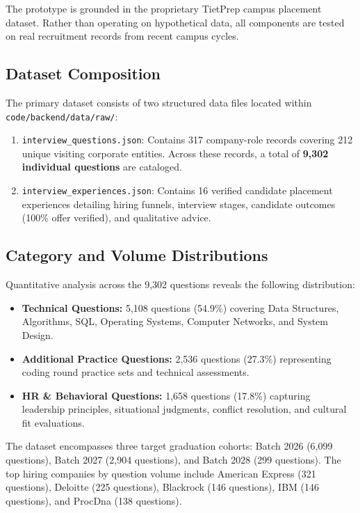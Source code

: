 \documentclass[11pt]{article}
\begin{document}
The prototype is grounded in the proprietary TietPrep campus placement dataset. Rather than operating on hypothetical data, all components are tested on real recruitment records from recent campus cycles.

\subsection{Dataset Composition}
The primary dataset consists of two structured data files located within \texttt{code/backend/data/raw/}:
\begin{enumerate}[leftmargin=1.5em]
    \item \texttt{interview\_questions.json}: Contains 317 company-role records covering 212 unique visiting corporate entities. Across these records, a total of \textbf{9,302 individual questions} are cataloged.
    \item \texttt{interview\_experiences.json}: Contains 16 verified candidate placement experiences detailing hiring funnels, interview stages, candidate outcomes (100\% offer verified), and qualitative advice.
\end{enumerate}

\subsection{Category and Volume Distributions}
Quantitative analysis across the 9,302 questions reveals the following distribution:
\begin{itemize}[leftmargin=1.5em]
    \item \textbf{Technical Questions:} 5,108 questions (54.9\%) covering Data Structures, Algorithms, SQL, Operating Systems, Computer Networks, and System Design.
    \item \textbf{Additional Practice Questions:} 2,536 questions (27.3\%) representing coding round practice sets and technical assessments.
    \item \textbf{HR \& Behavioral Questions:} 1,658 questions (17.8\%) capturing leadership principles, situational judgments, conflict resolution, and cultural fit evaluations.
\end{itemize}

The dataset encompasses three target graduation cohorts: Batch 2026 (6,099 questions), Batch 2027 (2,904 questions), and Batch 2028 (299 questions). The top hiring companies by question volume include American Express (321 questions), Deloitte (225 questions), Blackrock (146 questions), IBM (146 questions), and ProcDna (138 questions).
\end{document}
